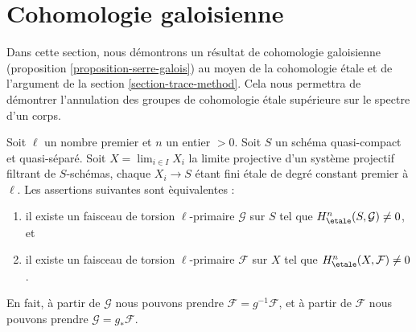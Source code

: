 \section{Cohomologie galoisienne}
\label{section-galois-cohomology}

\noindent
Dans cette section, nous d\'emontrons un r\'esultat de cohomologie galoisienne
(proposition \ref{proposition-serre-galois})
au moyen de la cohomologie \'etale et de l'argument de la
section \ref{section-trace-method}.
Cela nous permettra de d\'emontrer l'annulation des groupes de cohomologie \'etale sup\'erieure
sur le spectre d'un corps.

\begin{lemma}
\label{lemma-nonvanishing-inherited}
Soit $\ell$ un nombre premier et $n$ un entier $> 0$.
Soit $S$ un sch\'ema quasi-compact et quasi-s\'epar\'e.
Soit $X = \lim_{i \in I} X_i$ la limite projective d'un
syst\`eme projectif filtrant de $S$-sch\'emas, chaque $X_i \to S$
\'etant fini \'etale de degr\'e constant premier \`a $\ell$.
Les assertions suivantes sont \`equivalentes :
\begin{enumerate}
\item il existe un faisceau de torsion $\ell$-primaire
$\mathcal{G}$ sur $S$ tel que $H_\etale^n(S, \mathcal{G}) \neq 0$, et
\item il existe un faisceau de torsion $\ell$-primaire $\mathcal{F}$ sur $X$
tel que $H_\etale^n(X, \mathcal{F}) \neq 0$.
\end{enumerate}
En fait, \`a partir de
$\mathcal{G}$ nous pouvons prendre $\mathcal{F} = g^{-1}\mathcal{F}$,
et \`a partir de
$\mathcal{F}$ nous pouvons prendre $\mathcal{G} = g_*\mathcal{F}$.
\end{lemma}

